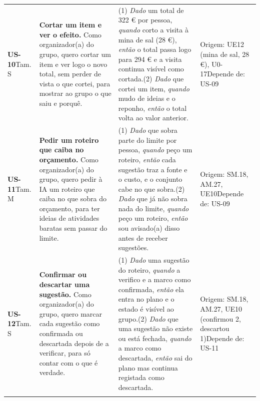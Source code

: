{\begin{longtable}{@{}p{1.5cm}p{5.1cm}p{5.2cm}p{3.6cm}@{}}
\textbf{US-10}\newline Tam. S & \textbf{Cortar um item e ver o efeito.} Como organizador(a) do grupo, quero cortar um item e ver logo o novo total, sem perder de vista o que cortei, para mostrar ao grupo o que saiu e porquê. & (1) \textit{Dado} um total de 322 € por pessoa, \textit{quando} corto a visita à mina de sal (28 €), \textit{então} o total passa logo para 294 € e a visita continua visível como cortada.\newline (2) \textit{Dado} que cortei um item, \textit{quando} mudo de ideias e o reponho, \textit{então} o total volta ao valor anterior. & Origem: UE12 (mina de sal, 28 €), U0-17\newline Depende de: US-09 \\ \addlinespace
\textbf{US-11}\newline Tam. M & \textbf{Pedir um roteiro que caiba no orçamento.} Como organizador(a) do grupo, quero pedir à IA um roteiro que caiba no que sobra do orçamento, para ter ideias de atividades baratas sem passar do limite. & (1) \textit{Dado} que sobra parte do limite por pessoa, \textit{quando} peço um roteiro, \textit{então} cada sugestão traz a fonte e o custo, e o conjunto cabe no que sobra.\newline (2) \textit{Dado} que já não sobra nada do limite, \textit{quando} peço um roteiro, \textit{então} sou avisado(a) disso antes de receber sugestões. & Origem: SM.18, AM.27, UE10\newline Depende de: US-09 \\ \addlinespace
\textbf{US-12}\newline Tam. S & \textbf{Confirmar ou descartar uma sugestão.} Como organizador(a) do grupo, quero marcar cada sugestão como confirmada ou descartada depois de a verificar, para só contar com o que é verdade. & (1) \textit{Dado} uma sugestão do roteiro, \textit{quando} a verifico e a marco como confirmada, \textit{então} ela entra no plano e o estado é visível ao grupo.\newline (2) \textit{Dado} que uma sugestão não existe ou está fechada, \textit{quando} a marco como descartada, \textit{então} sai do plano mas continua registada como descartada. & Origem: SM.18, AM.27, UE10 (confirmou 2, descartou 1)\newline Depende de: US-11 \\ \addlinespace

\end{longtable}}
